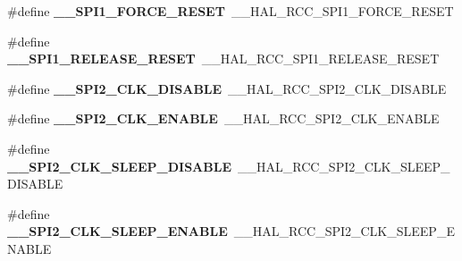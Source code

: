 \begin{DoxyCompactItemize}
\item 
\hypertarget{group___h_a_l___r_c_c___aliased_gab4534be76388b22aba929a389ce90961}{\#define {\bfseries \-\_\-\-\_\-\-S\-P\-I1\-\_\-\-F\-O\-R\-C\-E\-\_\-\-R\-E\-S\-E\-T}~\-\_\-\-\_\-\-H\-A\-L\-\_\-\-R\-C\-C\-\_\-\-S\-P\-I1\-\_\-\-F\-O\-R\-C\-E\-\_\-\-R\-E\-S\-E\-T}\label{group___h_a_l___r_c_c___aliased_gab4534be76388b22aba929a389ce90961}

\item 
\hypertarget{group___h_a_l___r_c_c___aliased_gad44d06addea92043b0baf1add7ec7d5b}{\#define {\bfseries \-\_\-\-\_\-\-S\-P\-I1\-\_\-\-R\-E\-L\-E\-A\-S\-E\-\_\-\-R\-E\-S\-E\-T}~\-\_\-\-\_\-\-H\-A\-L\-\_\-\-R\-C\-C\-\_\-\-S\-P\-I1\-\_\-\-R\-E\-L\-E\-A\-S\-E\-\_\-\-R\-E\-S\-E\-T}\label{group___h_a_l___r_c_c___aliased_gad44d06addea92043b0baf1add7ec7d5b}

\item 
\hypertarget{group___h_a_l___r_c_c___aliased_ga64cc32462513227e3da046275f99a3ad}{\#define {\bfseries \-\_\-\-\_\-\-S\-P\-I2\-\_\-\-C\-L\-K\-\_\-\-D\-I\-S\-A\-B\-L\-E}~\-\_\-\-\_\-\-H\-A\-L\-\_\-\-R\-C\-C\-\_\-\-S\-P\-I2\-\_\-\-C\-L\-K\-\_\-\-D\-I\-S\-A\-B\-L\-E}\label{group___h_a_l___r_c_c___aliased_ga64cc32462513227e3da046275f99a3ad}

\item 
\hypertarget{group___h_a_l___r_c_c___aliased_ga37312dc0b6032476ee2a0bde4d4c601c}{\#define {\bfseries \-\_\-\-\_\-\-S\-P\-I2\-\_\-\-C\-L\-K\-\_\-\-E\-N\-A\-B\-L\-E}~\-\_\-\-\_\-\-H\-A\-L\-\_\-\-R\-C\-C\-\_\-\-S\-P\-I2\-\_\-\-C\-L\-K\-\_\-\-E\-N\-A\-B\-L\-E}\label{group___h_a_l___r_c_c___aliased_ga37312dc0b6032476ee2a0bde4d4c601c}

\item 
\hypertarget{group___h_a_l___r_c_c___aliased_gac77dfd862a3f8a848bad3f5d02822003}{\#define {\bfseries \-\_\-\-\_\-\-S\-P\-I2\-\_\-\-C\-L\-K\-\_\-\-S\-L\-E\-E\-P\-\_\-\-D\-I\-S\-A\-B\-L\-E}~\-\_\-\-\_\-\-H\-A\-L\-\_\-\-R\-C\-C\-\_\-\-S\-P\-I2\-\_\-\-C\-L\-K\-\_\-\-S\-L\-E\-E\-P\-\_\-\-D\-I\-S\-A\-B\-L\-E}\label{group___h_a_l___r_c_c___aliased_gac77dfd862a3f8a848bad3f5d02822003}

\item 
\hypertarget{group___h_a_l___r_c_c___aliased_gac05baf49d88f18c0f641dca961464abe}{\#define {\bfseries \-\_\-\-\_\-\-S\-P\-I2\-\_\-\-C\-L\-K\-\_\-\-S\-L\-E\-E\-P\-\_\-\-E\-N\-A\-B\-L\-E}~\-\_\-\-\_\-\-H\-A\-L\-\_\-\-R\-C\-C\-\_\-\-S\-P\-I2\-\_\-\-C\-L\-K\-\_\-\-S\-L\-E\-E\-P\-\_\-\-E\-N\-A\-B\-L\-E}\label{group___h_a_l___r_c_c___aliased_gac05baf49d88f18c0f641dca961464abe}


\end{DoxyCompactItemize}
